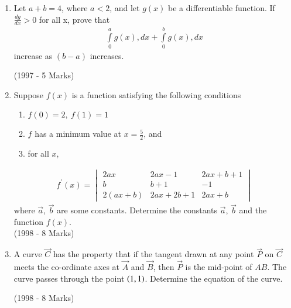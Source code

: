 \documentclass[journal,12pt,twocolumn]{IEEEtran}
\theoremstyle{remark}
\begin{document}
\begin{enumerate}
\item Let $a + b = 4$, where $a<2$, and let $g(x)$ be a differentiable function.
If $\frac{dg}{dx}>0$ for all x, prove that 
\begin{align*}
    \int\limits_0^a g(x), dx + \int\limits_0^b g(x), dx 
\end{align*}increase as $(b-a)$ increases.

\hfill (1997 - 5 Marks)


\item Suppose $f(x)$ is a function satisfying the following conditions
\begin{enumerate}
\item $f(0) = 2,\ f(1) = 1$
\item $f$ has a minimum value at $x = \frac{5}{2}$, and
\item for all $x$,
\end{enumerate}
\begin{align*}
f^{\prime}(x)=
\begin{vmatrix}
2ax & 2ax-1 & 2ax+b+1\\
b & b+1 & -1\\
2(ax+b) & 2ax+2b+1 & 2ax+b
\end{vmatrix}
\end{align*}
where $\vec{a}$, $\vec{b}$ are some constants. Determine the constants $\vec{a}$, $\vec{b}$ and the function $f(x)$.\\
\hfill (1998 - 8 Marks)

\item A curve $\vec{C}$ has the property that if the tangent drawn at any point $\vec{P}$ on $\vec{C}$ meets the co-ordinate axes at $\vec{A}$ and $\vec{B}$, then $\vec{P}$ is the mid-point of $AB$. The curve passes through the point $\left(1,1\right)$. Determine the equation of the curve.

\hfill (1998 - 8 Marks)

 
\end{enumerate}
\end{document}
